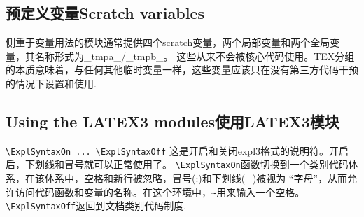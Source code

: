 \subsection{预定义变量Scratch variables}
侧重于变量用法的模块通常提供四个scratch变量，两个局部变量和两个全局变量，其名称形式为\_tmpa\_/\_tmpb\_。
这些从来不会被核心代码使用。TEX分组的本质意味着，与任何其他临时变量一样，这些变量应该只在没有第三方代码干预的情况下设置和使用.
\subsection{Using the LATEX3 modules使用LATEX3模块}
\verb|\ExplSyntaxOn ... \ExplSyntaxOff| 这是开启和关闭expl3格式的说明符。开启后，下划线和冒号就可以正常使用了。
\verb|\ExplSyntaxOn|函数切换到一个类别代码体系，在该体系中，空格和新行被忽略，冒号(:)和下划线(\_)被视为
“字母”，从而允许访问代码函数和变量的名称。在这个环境中，\verb|~|用来输入一个空格。\verb|\ExplSyntaxOff|返回到文档类别代码制度.

